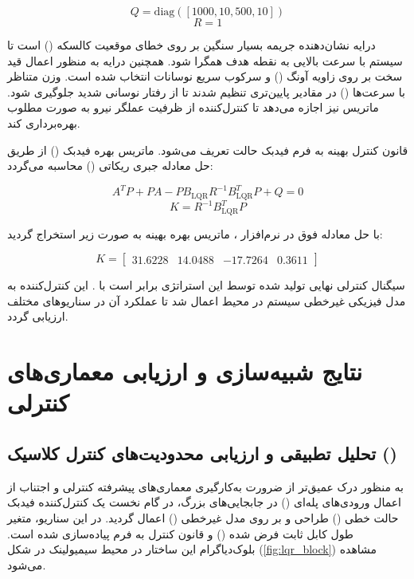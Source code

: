 \begin{equation}
    Q = \mathrm{diag}([1000, 10, 500, 10])
\end{equation}
\begin{equation}
    R = 1
\end{equation}

درایه  نشان‌دهنده جریمه بسیار سنگین بر روی خطای موقعیت کالسکه () است تا سیستم با سرعت بالایی به نقطه هدف همگرا شود. همچنین درایه  به منظور اعمال قید سخت بر روی زاویه آونگ (\lr{$\theta$}) و سرکوب سریع نوسانات انتخاب شده است. وزن متناظر با سرعت‌ها () در مقادیر پایین‌تری تنظیم شدند تا از رفتار نوسانی شدید جلوگیری شود. ماتریس  نیز اجازه می‌دهد تا کنترل‌کننده از ظرفیت عملگر نیرو به صورت مطلوب بهره‌برداری کند.

قانون کنترل بهینه به فرم فیدبک حالت  تعریف می‌شود. ماتریس بهره فیدبک () از طریق حل معادله جبری ریکاتی () محاسبه می‌گردد:

\begin{equation}
    A^T P + P A - P B_{\mathrm{LQR}} R^{-1} B_{\mathrm{LQR}}^T P + Q = 0
\end{equation}
\begin{equation}
    K = R^{-1} B_{\mathrm{LQR}}^T P
\end{equation}

با حل معادله فوق در نرم‌افزار ، ماتریس بهره بهینه  به صورت زیر استخراج گردید:

\begin{equation}
    K = \begin{bmatrix} 31.6228 & 14.0488 & -17.7264 & 0.3611 \end{bmatrix}
\end{equation}

سیگنال کنترلی نهایی تولید شده توسط این استراتژی برابر است با . این کنترل‌کننده به مدل فیزیکی غیرخطی سیستم در محیط  اعمال شد تا عملکرد آن در سناریوهای مختلف ارزیابی گردد.

\section{نتایج شبیه‌سازی و ارزیابی معماری‌های کنترلی}

\subsection{تحلیل تطبیقی و ارزیابی محدودیت‌های کنترل کلاسیک ()}
به منظور درک عمیق‌تر از ضرورت به‌کارگیری معماری‌های پیشرفته کنترلی و اجتناب از اعمال ورودی‌های پله‌ای () در جابجایی‌های بزرگ، در گام نخست یک کنترل‌کننده فیدبک حالت خطی () طراحی و بر روی مدل غیرخطی () اعمال گردید. در این سناریو، متغیر طول کابل ثابت فرض شده () و قانون کنترل به فرم  پیاده‌سازی شده است. بلوک‌دیاگرام این ساختار در محیط سیمیولینک در شکل (\ref{fig:lqr_block}) مشاهده می‌شود.

